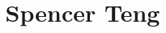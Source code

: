 \documentclass[11pt]{article} %
\begin{document}
{\selectfont



\hspace{-1.2em}\title{ Spencer Teng } 

%
%
%


}
\end{document}
